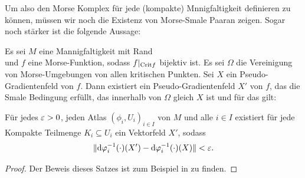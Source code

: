 Um also den Morse Komplex für jede (kompakte) Mnnigfaltigkeit definieren zu können, müssen wir noch die 
Existenz von Morse-Smale Paaran zeigen. Sogar noch stärker ist die folgende Aussage:

\begin{theorem}
    Es sei $M$ eine Mannigfaltigkeit mit Rand  \\
    und $f$ eine Morse-Funktion, sodass $f|_{{ \operatorname{Crit} }{f}}$ bijektiv ist. Es sei $\Omega$ die Vereinigung 
    von Morse-Umgebungen von allen kritischen Punkten. Sei $X$ ein Pseudo-Gradientenfeld von $f$. 
    Dann existiert ein Pseudo-Gradientenfeld $X'$ von $f$, das die Smale Bedingung erfüllt, das 
    innerhalb von $\Omega$ gleich $X$ ist und für das gilt:

    Für jedes $\varepsilon > 0$, jeden Atlas $(\phi_i, U_i)_{i \in I}$ von $M$ und alle $i \in I$ existiert 
    für jede Kompakte Teilmenge $K_i \subseteq U_i$ ein Vektorfeld $X'$, sodass 
    \[ \| { \operatorname{d} } \varphi_i^{-1} (\cdot) (X') - { \operatorname{d} } \varphi_i^{-1} (\cdot) (X) \| < \varepsilon . \]
\end{theorem}

\begin{proof}
     Der Beweis dieses Satzes ist zum Beispiel in \cite{audin} zu finden.
\end{proof}
